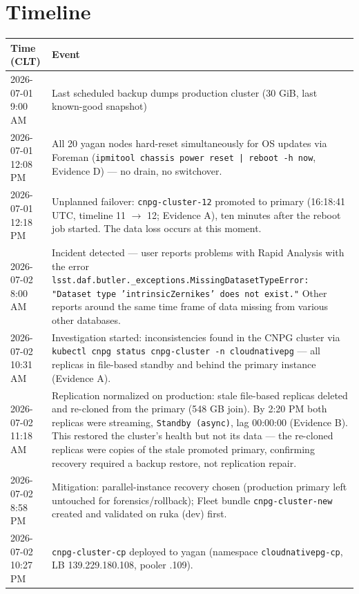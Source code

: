 \documentclass[PMO,authoryear,toc]{lsstdoc}
\begin{document}
\section{Timeline}

\begin{longtable}{p{}p{}}
\hline
\textbf{Time (CLT)} & \textbf{Event} \\
\hline
\endhead
2026-07-01 9:00 AM & Last scheduled backup dumps production cluster (30 GiB,
  last known-good snapshot) \\
2026-07-01 12:08 PM & All 20 yagan nodes hard-reset simultaneously for OS
  updates via Foreman (\texttt{ipmitool chassis power reset | reboot -h now},
  Evidence D) --- no drain, no switchover. \\
2026-07-01 12:18 PM & Unplanned failover: \texttt{cnpg-cluster-12} promoted to
  primary (16:18:41 UTC, timeline 11 $\rightarrow$ 12; Evidence A), ten
  minutes after the reboot job started. The data loss occurs at this moment. \\
2026-07-02 8:00 AM & Incident detected --- user reports problems with Rapid
  Analysis with the error
  \texttt{lsst.daf.butler.\_exceptions.MissingDatasetTypeError: "Dataset type
  'intrinsicZernikes' does not exist."} Other reports around the same time
  frame of data missing from various other databases. \\
2026-07-02 10:31 AM & Investigation started: inconsistencies found in the CNPG
  cluster via \texttt{kubectl cnpg status cnpg-cluster -n cloudnativepg} ---
  all replicas in file-based standby and behind the primary instance
  (Evidence A). \\
2026-07-02 11:18 AM & Replication normalized on production: stale file-based
  replicas deleted and re-cloned from the primary (548 GB join). By 2:20 PM
  both replicas were streaming, \texttt{Standby (async)}, lag 00:00:00
  (Evidence B). This restored the cluster's health but not its data --- the
  re-cloned replicas were copies of the stale promoted primary, confirming
  recovery required a backup restore, not replication repair. \\
2026-07-02 8:58 PM & Mitigation: parallel-instance recovery chosen (production
  primary left untouched for forensics/rollback); Fleet bundle
  \texttt{cnpg-cluster-new} created and validated on ruka (dev) first. \\
2026-07-02 10:27 PM & \texttt{cnpg-cluster-cp} deployed to yagan (namespace
  \texttt{cloudnativepg-cp}, LB 139.229.180.108, pooler .109). \\

\end{longtable}
\end{document}
